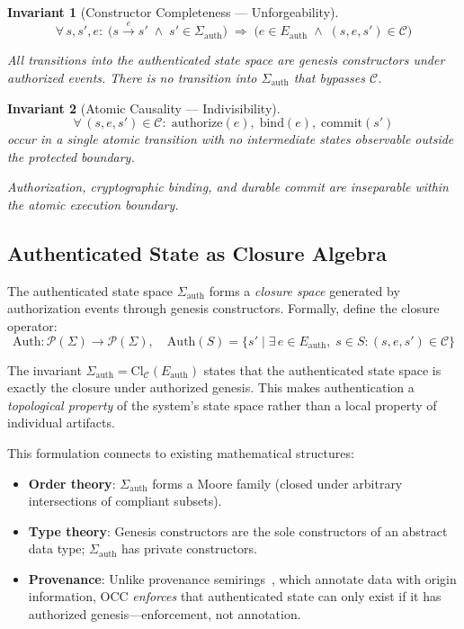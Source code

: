\documentclass[11pt,letterpaper]{article}
\theoremstyle{occplain}
\theoremstyle{occremark}
\newtheorem{invariant}{Invariant}[section]
\newcommand{\Sigauth}{\Sigma_{\mathrm{auth}}}
\newcommand{\Eauth}{E_{\mathrm{auth}}}
\newcommand{\ClC}{\mathrm{Cl}_{\mathcal{C}}}
\newcommand{\Auth}{\mathrm{Auth}}
\begin{document}
\begin{invariant}[Constructor Completeness --- Unforgeability]
\label{inv:completeness}
\[
  \forall\, s, s', e :\;
  \bigl(s \xrightarrow{e} s' \;\wedge\; s' \in \Sigauth\bigr)
  \;\Rightarrow\;
  \bigl(e \in \Eauth \;\wedge\; (s, e, s') \in \mathcal{C}\bigr)
\]

All transitions into the authenticated state space are genesis constructors under authorized events. There is no transition into $\Sigauth$ that bypasses $\mathcal{C}$.
\end{invariant}

\begin{invariant}[Atomic Causality --- Indivisibility]
\label{inv:atomic-causality}
\[
  \forall\, (s, e, s') \in \mathcal{C} :\;
  \mathrm{authorize}(e),\; \mathrm{bind}(e),\; \mathrm{commit}(s')
\]
occur in a single atomic transition with no intermediate states observable outside the protected boundary.

Authorization, cryptographic binding, and durable commit are inseparable within the atomic execution boundary.
\end{invariant}


\subsection{Authenticated State as Closure Algebra}
\label{sec:closure-algebra}

The authenticated state space $\Sigauth$ forms a \emph{closure space} generated by authorization events through genesis constructors. Formally, define the closure operator:
\[
  \Auth : \mathcal{P}(\Sigma) \rightarrow \mathcal{P}(\Sigma), \quad
  \Auth(S) = \{ s' \mid \exists\, e \in \Eauth,\; s \in S : (s, e, s') \in \mathcal{C} \}
\]

The invariant $\Sigauth = \ClC(\Eauth)$ states that the authenticated state space is exactly the closure under authorized genesis. This makes authentication a \emph{topological property} of the system's state space rather than a local property of individual artifacts.

This formulation connects to existing mathematical structures:
\begin{itemize}
  \item \textbf{Order theory}: $\Sigauth$ forms a Moore family (closed under arbitrary intersections of compliant subsets).
  \item \textbf{Type theory}: Genesis constructors are the sole constructors of an abstract data type; $\Sigauth$ has private constructors.
  \item \textbf{Provenance}: Unlike provenance semirings~\cite{green2007}, which annotate data with origin information, OCC \emph{enforces} that authenticated state can only exist if it has authorized genesis---enforcement, not annotation.
\end{itemize}
\end{document}
